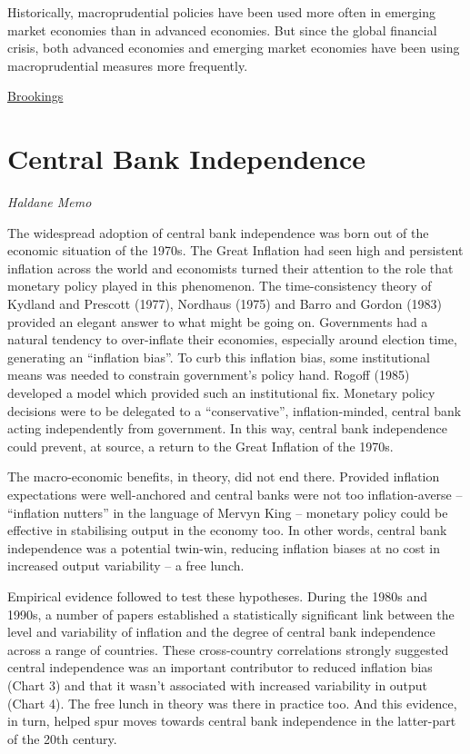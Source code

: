 \documentclass[
]{book}
\begin{document}
Historically, macroprudential policies have been used more often in emerging market economies than in advanced economies. But since the global financial crisis, both advanced economies and emerging market economies have been using macroprudential measures more frequently.

\href{https://www.brookings.edu/blog/up-front/2020/02/11/what-are-macroprudential-tools/}{Brookings}

\hypertarget{central-bank-independence-1}{%
\section{Central Bank Independence}\label{central-bank-independence-1}}

\emph{Haldane Memo}

The widespread adoption of central bank independence was born out of the economic situation of the 1970s. The Great Inflation had seen high and persistent inflation across the world and economists turned their attention to the role that monetary policy played in this phenomenon. The time-consistency theory of Kydland and Prescott (1977), Nordhaus (1975) and Barro and Gordon (1983) provided an elegant answer to what might be going on. Governments had a natural tendency to over-inflate their economies, especially around election time, generating an ``inflation bias''. To curb this inflation bias, some institutional means was needed to constrain government's policy hand. Rogoff (1985) developed a model which provided such an institutional fix. Monetary policy decisions were to be delegated to a ``conservative'', inflation-minded, central bank acting independently from government. In this way, central bank independence could prevent, at source, a return to the Great Inflation of the 1970s.

The macro-economic benefits, in theory, did not end there. Provided inflation expectations were well-anchored and central banks were not too inflation-averse -- ``inflation nutters'' in the language of Mervyn King -- monetary policy could be effective in stabilising output in the economy too. In other words, central bank independence was a potential twin-win, reducing inflation biases at no cost in increased output variability -- a free lunch.

Empirical evidence followed to test these hypotheses. During the 1980s and 1990s, a number of papers established a statistically significant link between the level and variability of inflation and the degree of central bank independence across a range of countries. These cross-country correlations strongly suggested central independence was an important contributor to reduced inflation bias (Chart 3) and that it wasn't associated with increased variability in output (Chart 4). The free lunch in theory was there in practice too. And this evidence, in turn, helped spur moves towards central bank independence in the latter-part of the 20th century.
\end{document}
